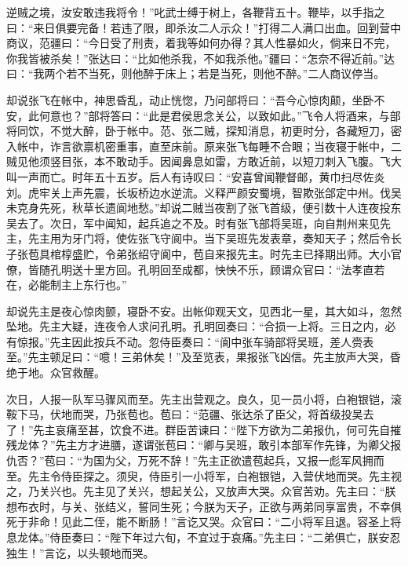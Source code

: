 逆贼之境，汝安敢违我将令！”叱武士缚于树上，各鞭背五十。鞭毕，以手指之曰：“来日俱要完备！若违了限，即杀汝二人示众！”打得二人满口出血。回到营中商议，范疆曰：“今日受了刑责，着我等如何办得？其人性暴如火，倘来日不完，你我皆被杀矣！”张达曰：“比如他杀我，不如我杀他。”疆曰：“怎奈不得近前。”达曰：“我两个若不当死，则他醉于床上；若是当死，则他不醉。”二人商议停当。

却说张飞在帐中，神思昏乱，动止恍惚，乃问部将曰：“吾今心惊肉颠，坐卧不安，此何意也？”部将答曰：“此是君侯思念关公，以致如此。”飞令人将酒来，与部将同饮，不觉大醉，卧于帐中。范、张二贼，探知消息，初更时分，各藏短刀，密入帐中，诈言欲禀机密重事，直至床前。原来张飞每睡不合眼；当夜寝于帐中，二贼见他须竖目张，本不敢动手。因闻鼻息如雷，方敢近前，以短刀刺入飞腹。飞大叫一声而亡。时年五十五岁。后人有诗叹曰：“安喜曾闻鞭督邮，黄巾扫尽佐炎刘。虎牢关上声先震，长坂桥边水逆流。义释严颜安蜀境，智欺张郃定中州。伐吴未克身先死，秋草长遗阆地愁。”却说二贼当夜割了张飞首级，便引数十人连夜投东吴去了。次日，军中闻知，起兵追之不及。时有张飞部将吴班，向自荆州来见先主，先主用为牙门将，使佐张飞守阆中。当下吴班先发表章，奏知天子；然后令长子张苞具棺椁盛贮，令弟张绍守阆中，苞自来报先主。时先主已择期出师。大小官僚，皆随孔明送十里方回。孔明回至成都，怏怏不乐，顾谓众官曰：“法孝直若在，必能制主上东行也。”

却说先主是夜心惊肉颤，寝卧不安。出帐仰观天文，见西北一星，其大如斗，忽然坠地。先主大疑，连夜令人求问孔明。孔明回奏曰：“合损一上将。三日之内，必有惊报。”先主因此按兵不动。忽侍臣奏曰：“阆中张车骑部将吴班，差人赍表至。”先主顿足曰：“噫！三弟休矣！”及至览表，果报张飞凶信。先主放声大哭，昏绝于地。众官救醒。

次日，人报一队军马骤风而至。先主出营观之。良久，见一员小将，白袍银铠，滚鞍下马，伏地而哭，乃张苞也。苞曰：“范疆、张达杀了臣父，将首级投吴去了！”先主哀痛至甚，饮食不进。群臣苦谏曰：“陛下方欲为二弟报仇，何可先自摧残龙体？”先主方才进膳，遂谓张苞曰：“卿与吴班，敢引本部军作先锋，为卿父报仇否？”苞曰：“为国为父，万死不辞！”先主正欲遣苞起兵，又报一彪军风拥而至。先主令侍臣探之。须臾，侍臣引一小将军，白袍银铠，入营伏地而哭。先主视之，乃关兴也。先主见了关兴，想起关公，又放声大哭。众官苦劝。先主曰：“朕想布衣时，与关、张结义，誓同生死；今朕为天子，正欲与两弟同享富贵，不幸俱死于非命！见此二侄，能不断肠！”言讫又哭。众官曰：“二小将军且退。容圣上将息龙体。”侍臣奏曰：“陛下年过六旬，不宜过于哀痛。”先主曰：“二弟俱亡，朕安忍独生！”言讫，以头顿地而哭。

